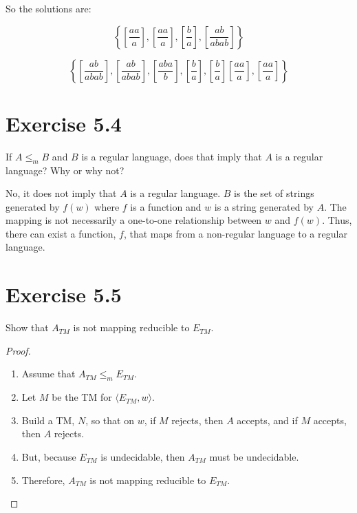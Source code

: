 \documentclass{article}
\begin{document}
So the solutions are:

\begin{equation*}
	\left\{ 
		\left[\frac{aa}{a}\right], 
		\left[\frac{aa}{a}\right],
		\left[\frac{b}{a}\right], 
		\left[\frac{ab}{abab}\right] 
	\right\}
\end{equation*}

\begin{equation*}
	\left\{ 
		\left[\frac{ab}{abab}\right], 
		\left[\frac{ab}{abab}\right],
		\left[\frac{aba}{b}\right], 
		\left[\frac{b}{a}\right], 
		\left[\frac{b}{a}\right] 
		\left[\frac{aa}{a}\right], 
		\left[\frac{aa}{a}\right]
	\right\}
\end{equation*}

\section{Exercise 5.4}

If $A \leq_m B$ and $B$ is a regular language, does that imply that $A$ is a
regular language? Why or why not?

No, it does not imply that $A$ is a regular language. $B$ is the set of strings
generated by $f(w)$ where $f$ is a function and $w$ is a string generated by
$A$. The mapping is not necessarily a one-to-one relationship between $w$ and
$f(w)$. Thus, there can exist a function, $f$, that maps from a non-regular language to
a regular language.

\section{Exercise 5.5}

Show that $A_{TM}$ is not mapping reducible to $E_{TM}$. 

\begin{proof}
	\mbox{}
	\begin{enumerate}
	  \item Assume that $A_{TM} \leq_m E_{TM}$.
	  \item Let $M$ be the TM for $\langle E_{TM}, w \rangle$.
	  \item Build a TM, $N$, so that on $w$, if $M$ rejects, then $A$ accepts, and
	  if $M$ accepts, then $A$ rejects.
	  \item But, because $E_{TM}$ is undecidable, then $A_{TM}$ must be
	  undecidable. 
	  \item Therefore, $A_{TM}$ is not mapping reducible to $E_{TM}$.\qedhere
	\end{enumerate}
\end{proof}
\end{document}
